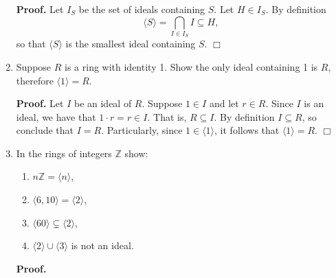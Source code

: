 \documentclass[9pt]{article}
\newcommand{\qed}{\hfill \ensuremath{\Box}}
\newcommand{\cyc}[1]{\langle #1 \rangle}
\newcommand{\Z}{\mathbb{Z}}
\begin{document}
\begin{enumerate}
      \textbf{Proof.} Let $I_S$ be the set of ideals containing $S$.
      Let $H \in I_S$. By definition
      $$\cyc{S} = \bigcap_{I \in I_S}I \subseteq H,$$
      so that $\cyc{S}$ is the smallest ideal containing $S$. \qed
   \item Suppose $R$ is a ring with identity 1. Show the only ideal containing
         1 is $R$, therefore $\cyc{1} = R$.
         
      \textbf{Proof.}  Let $I$ be an ideal of $R$. Suppose $1 \in I$ and let
      $r \in R$. Since $I$ is an ideal, we have that $1 \cdot r = r \in I$. That
      is, $R \subseteq I$. By definition $I \subseteq R$, so conclude that
      $I = R$. Particularly, since $1 \in \cyc{1}$, it follows that
      $\cyc{1} = R$. \qed
   \item In the rings of integers $\Z$ show:
         \begin{enumerate}
            \item $n\Z = \cyc{n}$,
            \item $\cyc{6, 10} = \cyc{2}$,
            \item $\cyc{60} \subsetneq \cyc{2}$,
            \item $\cyc{2} \cup \cyc{3}$ is not an ideal.
         \end{enumerate}
         
      \textbf{Proof.}
      

\end{enumerate}
\end{document}
